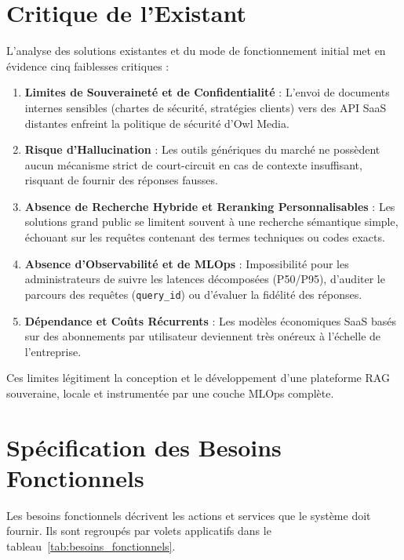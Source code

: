\section{Critique de l'Existant}
L'analyse des solutions existantes et du mode de fonctionnement initial met en évidence cinq faiblesses critiques :
\begin{enumerate}
    \item \textbf{Limites de Souveraineté et de Confidentialité} : L'envoi de documents internes sensibles (chartes de sécurité, stratégies clients) vers des API SaaS distantes enfreint la politique de sécurité d'Owl Media.
    \item \textbf{Risque d'Hallucination} : Les outils génériques du marché ne possèdent aucun mécanisme strict de court-circuit en cas de contexte insuffisant, risquant de fournir des réponses fausses.
    \item \textbf{Absence de Recherche Hybride et Reranking Personnalisables} : Les solutions grand public se limitent souvent à une recherche sémantique simple, échouant sur les requêtes contenant des termes techniques ou codes exacts.
    \item \textbf{Absence d'Observabilité et de MLOps} : Impossibilité pour les administrateurs de suivre les latences décomposées (P50/P95), d'auditer le parcours des requêtes (\texttt{query\_id}) ou d'évaluer la fidélité des réponses.
    \item \textbf{Dépendance et Coûts Récurrents} : Les modèles économiques SaaS basés sur des abonnements par utilisateur deviennent très onéreux à l'échelle de l'entreprise.
\end{enumerate}

Ces limites légitiment la conception et le développement d'une plateforme RAG souveraine, locale et instrumentée par une couche MLOps complète.

\section{Spécification des Besoins Fonctionnels}
Les besoins fonctionnels décrivent les actions et services que le système doit fournir. Ils sont regroupés par volets applicatifs dans le tableau~\ref{tab:besoins_fonctionnels}.

